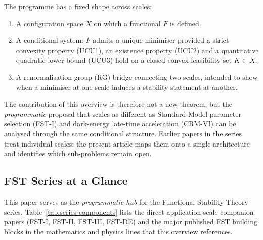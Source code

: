 \documentclass[11pt,a4paper]{article}
\theoremstyle{remark}
\begin{document}
The programme has a fixed shape across scales:
\begin{enumerate}[label=(\roman*),leftmargin=2em]
\item A configuration space $X$ on which a functional $F$ is defined.
\item A conditional system: $F$ admits a unique minimiser provided
      a strict convexity property (UCU1), an existence property (UCU2)
      and a quantitative quadratic lower bound (UCU3) hold on
      a closed convex feasibility set $K \subset X$.
\item A renormalisation-group (RG) bridge connecting two scales,
      intended to show when a minimiser at one scale induces a
      stability statement at another.
\end{enumerate}
The contribution of this overview is therefore not a new theorem,
but the \emph{programmatic} proposal that scales as different as
Standard-Model parameter selection (FST-I) and dark-energy late-time
acceleration (CRM-VI) can be analysed through the same conditional
structure. Earlier papers in the series treat individual scales; the
present article maps them onto a single architecture and identifies
which sub-problems remain open.

\subsection*{FST Series at a Glance}
\label{subsec:series-glance}

This paper serves as the \emph{programmatic hub} for the Functional
Stability Theory series. Table~\ref{tab:series-components} lists the
direct application-scale companion papers (FST-I, FST-II, FST-III,
FST-DE) and the major published FST building blocks in the mathematics
and physics lines that this overview references.
\end{document}
